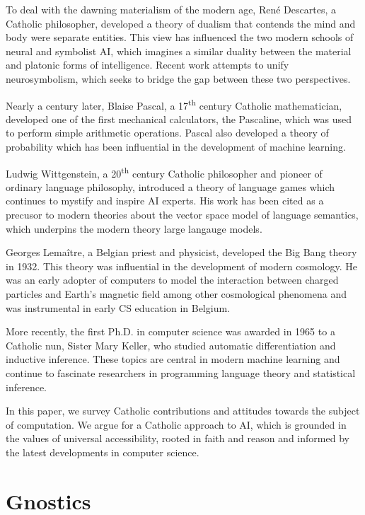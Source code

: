 \documentclass[sigplan,nonacm]{acmart}\settopmatter{printfolios=false,printccs=false,printacmref=false}
\begin{document}
  To deal with the dawning materialism of the modern age, Ren\'e Descartes, a Catholic philosopher, developed a theory of dualism that contends the mind and body were separate entities. This view has influenced the two modern schools of neural and symbolist AI, which imagines a similar duality between the material and platonic forms of intelligence. Recent work attempts to unify neurosymbolism, which seeks to bridge the gap between these two perspectives.

  Nearly a century later, Blaise Pascal, a 17\textsuperscript{th} century Catholic mathematician, developed one of the first mechanical calculators, the Pascaline, which was used to perform simple arithmetic operations. Pascal also developed a theory of probability which has been influential in the development of machine learning.

  Ludwig Wittgenstein, a 20\textsuperscript{th} century Catholic philosopher and pioneer of ordinary language philosophy, introduced a theory of language games which continues to mystify and inspire AI experts. His work has been cited as a precusor to modern theories about the vector space model of language semantics, which underpins the modern theory large langauge models.

  Georges Lema\^itre, a Belgian priest and physicist, developed the Big Bang theory in 1932. This theory was influential in the development of modern cosmology. He was an early adopter of computers to model the interaction between charged particles and Earth's magnetic field among other cosmological phenomena and was instrumental in early CS education in Belgium.

  More recently, the first Ph.D. in computer science was awarded in 1965 to a Catholic nun, Sister Mary Keller, who studied automatic differentiation and inductive inference. These topics are central in modern machine learning and continue to fascinate researchers in programming language theory and statistical inference.

  In this paper, we survey Catholic contributions and attitudes towards the subject of computation. We argue for a Catholic approach to AI, which is grounded in the values of universal accessibility, rooted in faith and reason and informed by the latest developments in computer science.

 \section{Gnostics}
\end{document}
